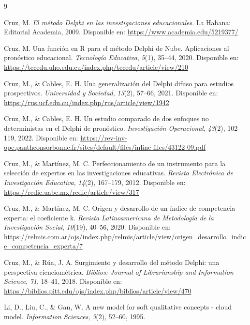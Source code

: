 \documentclass[11pt,a4paper]{article}
\begin{document}
\begin{thebibliography}{9}

Cruz, M. 
\emph{El método Delphi en las investigaciones educacionales}. 
La Habana: Editorial Academia, 2009. 
Disponible en: \url{https://www.academia.edu/5219377/}

Cruz, M. 
Una función en R para el método Delphi de Nube. Aplicaciones al pronóstico educacional. 
\emph{Tecnología Educativa}, \emph{5}(1), 35--44, 2020. 
Disponible en: \url{https://tecedu.uho.edu.cu/index.php/tecedu/article/view/210}

Cruz, M., \& Cables, E. H. 
Una generalización del Delphi difuso para estudios prospectivos.
\emph{Universidad y Sociedad}, \emph{13}(2), 57--66, 2021.
Disponible en: \url{https://rus.ucf.edu.cu/index.php/rus/article/view/1942}

Cruz, M., \& Cables, E. H. 
Un estudio comparado de dos enfoques no deterministas en el Delphi de pronóstico.
\emph{Investigación Operacional}, \emph{43}(2), 102--119, 2022.
Disponible en: \url{https://rev-inv-ope.pantheonsorbonne.fr/sites/default/files/inline-files/43122-09.pdf}

Cruz, M., \& Martínez, M. C. 
Perfeccionamiento de un instrumento para la selección de expertos en las investigaciones educativas.
\emph{Revista Electrónica de Investigación Educativa}, \emph{14}(2), 167--179, 2012.
Disponible en: \url{https://redie.uabc.mx/redie/article/view/317}

Cruz, M., \& Martínez, M. C. 
Origen y desarrollo de un índice de competencia experta: el coeficiente k.
\emph{Revista Latinoamericana de Metodología de la Investigación Social}, \emph{10}(19), 40--56, 2020.
Disponible en: \url{https://relmis.com.ar/ojs/index.php/relmis/article/view/origen_desarrollo_indice_competencia_experta/7}

Cruz, M., \& Rúa, J. A. 
Surgimiento y desarrollo del método Delphi: una perspectiva cienciométrica.
\emph{Biblios: Journal of Librarianship and Information Science}, \emph{71}, 18--41, 2018.
Disponible en: \url{https://biblios.pitt.edu/ojs/index.php/biblios/article/view/470}

Li, D., Liu, C., \& Gan, W. 
A new model for soft qualitative concepts - cloud model. 
\emph{Information Sciences}, \emph{3}(2), 52--60, 1995.

\end{thebibliography}
\end{document}
